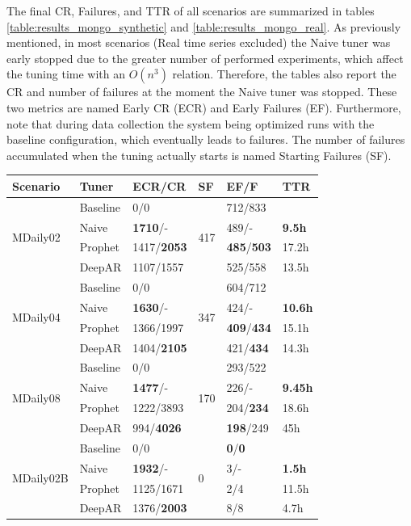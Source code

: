 \documentclass[a4paper, 12pt]{article} %
\newcommand{\ra}[1]{\renewcommand{\arraystretch}{#1}}
\begin{document}
	The final CR, Failures, and TTR of all scenarios are summarized in tables \ref{table:results_mongo_synthetic} and \ref{table:results_mongo_real}. As previously mentioned, in most scenarios (Real time series excluded) the Naive tuner was early stopped due to the greater number of performed experiments, which affect the tuning time with an $O(n^3)$ relation. Therefore, the tables also report the CR and number of failures at the moment the Naive tuner was stopped. These two metrics are named Early CR (ECR) and Early Failures (EF). Furthermore, note that during data collection the system being optimized runs with the baseline configuration, which eventually leads to failures. The number of failures accumulated when the tuning actually starts is named Starting Failures (SF).

	\begin{table}\centering 
		\ra{1.3}
		\begin{tabularx}{\textwidth}{@{}XXXXXX@{}}
			\toprule
			Scenario & Tuner & ECR/CR & SF & EF/F & TTR\\
			
			\midrule
			\multirow{4}{*}{MDaily02}
			& Baseline & 0/0 & \multirow{4}{*}{417} & 712/833 & \\
			& Naive & \textbf{1710}/-  && 489/- & \textbf{9.5h} \\
			& Prophet & 1417/\textbf{2053} && \textbf{485}/\textbf{503} & 17.2h\\
			& DeepAR & 1107/1557 && 525/558 & 13.5h\\
			
			
			\midrule
			\multirow{4}{*}{MDaily04}
			& Baseline & 0/0 & \multirow{4}{*}{347}  & 604/712 & \\
			& Naive & \textbf{1630}/- && 424/- & \textbf{10.6h} \\
			& Prophet & 1366/1997 && \textbf{409}/\textbf{434} & 15.1h \\
			& DeepAR & 1404/\textbf{2105} && 421/\textbf{434} & 14.3h \\
			
			\midrule
			\multirow{4}{*}{MDaily08}
			& Baseline & 0/0 & \multirow{4}{*}{170} & 293/522 & \\
			& Naive & \textbf{1477}/- && 226/- & \textbf{9.45h}\\
			& Prophet & 1222/3893 && 204/\textbf{234} & 18.6h\\
			& DeepAR & 994/\textbf{4026} && \textbf{198}/249 & 45h\\
			
			\midrule
			\multirow{4}{*}{MDaily02B}
			& Baseline & 0/0 & \multirow{4}{*}{0} & \textbf{0}/\textbf{0} & \\
			& Naive & \textbf{1932}/- && 3/- & \textbf{1.5h}  \\
			& Prophet & 1125/1671 && 2/4 & 11.5h \\
			& DeepAR & 1376/\textbf{2003} && 8/8 & 4.7h\\
			

\end{tabularx}
\end{table}
\end{document}
